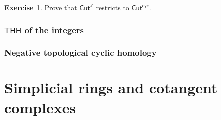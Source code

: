 \documentclass[10pt, oneside]{memoir}
\theoremstyle{definition}
\newtheorem{exer}[thm]{Exercise}
\theoremstyle{remark}
\theoremstyle{plain}
\theoremstyle{definition}
\theoremstyle{remark}
\newcommand{\Z}{\mathbb{Z}}
\newcommand{\F}{\mathbb{F}}
\newcommand{\ms}[1]{\mathsf{#1}}
\newcommand{\1}{\mathbf{1}}
\newcommand{\2}{\mathbf{2}}
\newcommand{\3}{\mathbf{3}}
\newcommand{\THH}{\ms{THH}}
\newcommand{\TC}{\ms{TC}}
\begin{document}
\begin{exer}
    Prove that $\ms{Cut}^{\Z}$ restricts to $\ms{Cut}^{\ms{cyc}}$.
\end{exer}


\subsection{$\THH$ of the integers}%
\label{sub:THH of the integers}

\subsection{Negative topological cyclic homology}%
\label{sub:Negative topological cyclic homology}










\appendix

\chapter{Simplicial rings and cotangent complexes}%
\label{cha:Appendices}
\thispagestyle{firstpage}
\end{document}
